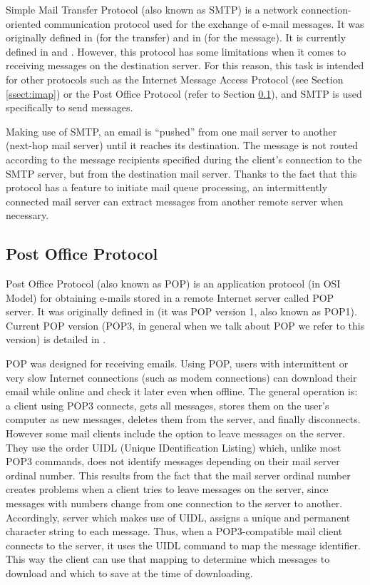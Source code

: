 Simple Mail Transfer Protocol (also known as SMTP) is a network connection-oriented communication protocol used for the exchange of e-mail messages. It was originally defined in \cite{rfc821} (for the transfer) and in \cite{rfc822} (for the message). It is currently defined in \cite{rfc5321} and \cite{rfc5322}. However, this protocol has some limitations when it comes to receiving messages on the destination server. For this reason, this task is intended for other protocols such as the Internet Message Access Protocol (see Section \ref{ssect:imap}) or the Post Office Protocol (refer to Section \ref{ssect:pop}), and SMTP is used specifically to send messages.

Making use of SMTP, an email is ``pushed'' from one mail server to another (next-hop mail server) until it reaches its destination. The message is not routed according to the message recipients specified during the client's connection to the SMTP server, but from the destination mail server. Thanks to the fact that this protocol has a feature to initiate mail queue processing, an intermittently connected mail server can extract messages from another remote server when necessary.

\subsection{Post Office Protocol} \label{ssect:pop}

Post Office Protocol (also known as POP) is an application protocol (in OSI Model) for obtaining e-mails stored in a remote Internet server called POP server. It was originally defined in \cite{rfc918} (it was POP version 1, also known as POP1). Current POP version (POP3, in general when we talk about POP we refer to this version) is detailed in \cite{rfc1939}.

POP was designed for receiving emails. Using POP, users with intermittent or very slow Internet connections (such as modem connections) can download their email while online and check it later even when offline. The general operation is: a client using POP3 connects, gets all messages, stores them on the user's computer as new messages, deletes them from the server, and finally disconnects. However some mail clients include the option to leave messages on the server. They use the order UIDL (Unique IDentification Listing) which, unlike most POP3 commands, does not identify messages depending on their mail server ordinal number. This results from the fact that the mail server ordinal number creates problems when a client tries to leave messages on the server, since messages with numbers change from one connection to the server to another. Accordingly, server which makes use of UIDL, assigns a unique and permanent character string to each message. Thus, when a POP3-compatible mail client connects to the server, it uses the UIDL command to map the message identifier. This way the client can use that mapping to determine which messages to download and which to save at the time of downloading.

